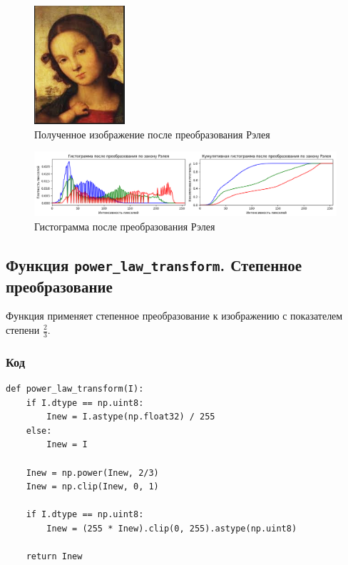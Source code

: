 \documentclass[a4paper,12pt]{article}
\begin{document}
\begin{figure}[H]
    \centering
    \includegraphics[width=0.3\textwidth]{im/imРелея.png}
    \caption{Полученное изображение после преобразования Рэлея}
    \label{fig:rayleigh_image}
\end{figure}

\begin{figure}[H]
    \centering
    \includegraphics[width=1\textwidth]{im/гистограммаРелея.png}
    \caption{Гистограмма после преобразования Рэлея}
    \label{fig:rayleigh_histogram}
\end{figure}




\subsection{Функция \texttt{power\_law\_transform}. Степенное преобразование}

Функция применяет степенное преобразование к изображению с показателем степени \( \frac{2}{3} \).

\subsubsection{Код}
\begin{verbatim}
def power_law_transform(I):
    if I.dtype == np.uint8:
        Inew = I.astype(np.float32) / 255
    else:
        Inew = I
    
    Inew = np.power(Inew, 2/3)
    Inew = np.clip(Inew, 0, 1)
    
    if I.dtype == np.uint8:
        Inew = (255 * Inew).clip(0, 255).astype(np.uint8)
    
    return Inew
\end{verbatim}
\end{document}
